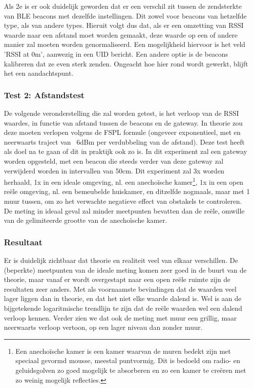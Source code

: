 Als 2e is er ook duidelijk geworden dat er een verschil zit tussen de zendsterkte van BLE beacons met dezelfde instellingen. Dit zowel voor beacons van hetzelfde type, als van andere types. Hieruit volgt dus dat, als er een omzetting van RSSI waarde naar een afstand moet worden gemaakt, deze waarde op een of andere manier zal moeten worden genormaliseerd. Een mogelijkheid hiervoor is het veld 'RSSI at 0m', aanwezig in een UID bericht. Een andere optie is de beacons kalibreren dat ze even sterk zenden. Ongeacht hoe hier rond wordt gewerkt, blijft het een aandachtspunt.

\subsubsection{Test 2: Afstandstest}
De volgende veronderstelling die zal worden getest, is het verloop van de RSSI waardes, in functie van afstand tussen de beacons en de gateway. In theorie zou deze moeten verlopen volgens de FSPL formule (ongeveer exponentieel, met en neerwaarts traject van ~6dBm per verdubbeling van de afstand). Deze test heeft als doel na te gaan of dit in praktijk ook zo is.
In dit experiment zal een gateway worden opgesteld, met een beacon die steeds verder van deze gateway zal verwijderd worden in intervallen van 50cm. Dit experiment zal 3x worden herhaald, 1x in een ideale omgeving, nl. een anechoïsche kamer\footnote{Een anechoïsche kamer is een kamer waarvan de muren bedekt zijn met speciaal gevormd mousse, meestal puntvormig. Dit is bedoeld om radio- en geluidsgolven zo goed mogelijk te absorberen en zo een kamer te creëren met zo weinig mogelijk reflecties.}, 1x in een open reële omgeving, nl. een bemeubelde huiskamer, en ditzelfde nogmaals, maar met 1 muur tussen, om zo het verwachte negatieve effect van obstakels te controleren. De meting in ideaal geval zal minder meetpunten bevatten dan de reële, omwille van de gelimiteerde grootte van de anechoïsche kamer.

\subsubsection{Resultaat}
Er is duidelijk zichtbaar dat theorie en realiteit veel van elkaar verschillen. De (beperkte) meetpunten van de ideale meting komen zeer goed in de buurt van de theorie, maar vanaf er wordt overgestapt naar een open reële ruimte zijn de resultaten zeer anders. Met als voornaamste bevindingen dat de waarden veel lager liggen dan in theorie, en dat het niet elke waarde dalend is. Wel is aan de bijgetekende logaritmische trendlijn te zijn dat de reële waarden wel een dalend verloop kennen. Verder zien we dat ook de meting met muur een grillig, maar neerwaarts verloop vertoon, op een lager niveau dan zonder muur.

